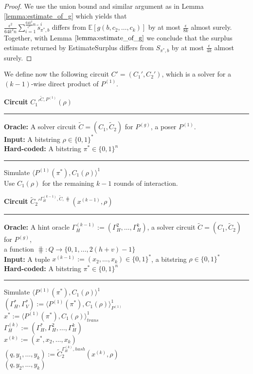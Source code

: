 \begin{proof}
We use the union bound and similar argument as in Lemma \ref{lemma:estimate_of_g}
which yields that \\$\frac{\epsilon^2}{64k^2n} \sum_{i=1}^{\frac{64k^2}{\epsilon^2}n} \widetilde{s}_{\pi^*,b}^i$ differs from
$\mathbb{E}[g(b, c_2, \dots, c_k)]$ by at most $\frac{\epsilon}{8k}$ almost surely. Together, with Lemma $\ref{lemma:estimate_of_g}$ we conclude that the surplus estimate
returned by EstimateSurplus differs from $S_{\pi^*,b}$ by at most $\frac{\epsilon}{4k}$ almost surely.
\end{proof}
%
%
We define now the following circuit $C' = (C_1', C_2')$, which is a solver for a $(k-1)$-wise direct product of $P^{(1)}$.
\begin{codeblock}
  \textbf{Circuit} $C_1'^{\widetilde{C}, P^{(1)}}(\rho)$
  \medskip \hrule \medskip
  \textbf{Oracle:} A solver circuit $\widetilde{C} = (C_1, \widetilde{C}_2)$ for $P^{(g)}$, a poser $P^{(1)}$. \\
  \textbf{Input:}  A bitstring $\rho \in \{0,1\}^{*}$ \\
  \textbf{Hard-coded:} A bitstring $\pi^* \in \{0,1\}^{n}$
  \medskip\hrule\medskip
  Simulate $\langle P^{(1)}(\pi^*), C_1(\rho)\rangle^1$ \\
  Use $C_1(\rho)$ for the remaining $k-1$ rounds of interaction.
\end{codeblock}
%
%
\begin{codeblock}
  \textbf{Circuit} $\widetilde{C}_2'^{\Gamma_H^{(k-1)}, \widetilde{C}, \hash}(x^{(k-1)}, \rho)$
  \medskip \hrule \medskip
  \textbf{Oracle:} A hint oracle $\Gamma_H^{(k-1)} := (\Gamma_H^{2}, \dots, \Gamma_H^{k})$, a solver circuit $\widetilde{C} = (C_1, \widetilde{C}_2)$ for $P^{(g)}$, \\
  \IndII a function $\hash: Q \rightarrow \{0,1,\dots, 2(h+v)-1\}$ \\
  \textbf{Input:}  A tuple $x^{(k-1)} := (x_2, \dotsc, x_{k}) \in \{0,1\}^{*}$, a bitstring $\rho \in \{0,1\}^{*}$\\
  \textbf{Hard-coded:} A bitstring $\pi^* \in \{0,1\}^{n}$
  \medskip\hrule\medskip
  Simulate $\langle P^{(1)}(\pi^*), C_1(\rho) \rangle^{1}$ \\
  \IndI $(\Gamma_H^*, \Gamma_V^*) := \langle P^{(1)}(\pi^*), C_1(\rho) \rangle^{1}_{P^{(1)}}$ \\
  \IndI $x^* := \langle P^{(1)}(\pi^*), C_1(\rho) \rangle^{1}_{\mathit{trans}}$ \\
  $\Gamma_H^{(k)} := (\Gamma_H^*, \Gamma_H^{2}, \dots, \Gamma_H^{k})$ \\
  $x^{(k)} := (x^*, x_2, \dots, x_{k})$ \\
  $(q, y_1, \dots, y_k) := \widetilde{C}_2^{\Gamma_H^{(k)}, \mathit{hash}}(x^{(k)}, \rho)$ \\
  \Return $(q, y_2, \dots, y_k)$
\end{codeblock}
